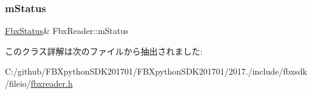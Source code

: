 \subsubsection{\texorpdfstring{m\+Status}{mStatus}}
{\footnotesize\ttfamily \hyperlink{class_fbx_status}{Fbx\+Status}\& Fbx\+Reader\+::m\+Status\hspace{0.3cm}{\ttfamily [protected]}}



このクラス詳解は次のファイルから抽出されました\+:\begin{DoxyCompactItemize}
\item 
C\+:/github/\+F\+B\+Xpython\+S\+D\+K201701/\+F\+B\+Xpython\+S\+D\+K201701/2017./include/fbxsdk/fileio/\hyperlink{fbxreader_8h}{fbxreader.\+h}\end{DoxyCompactItemize}
